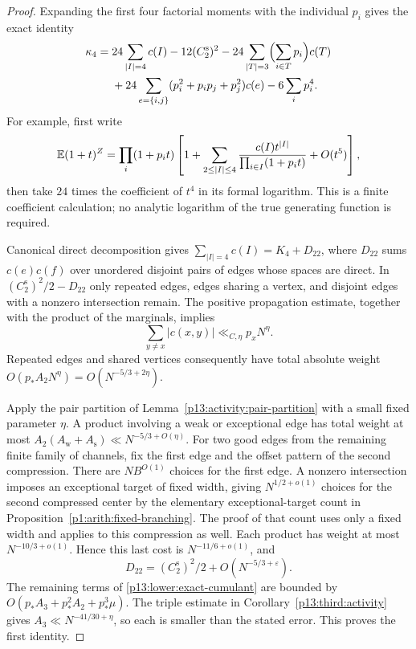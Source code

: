 \begin{proof}
Expanding the first four factorial moments with the individual $p_i$
gives the exact identity
\begin{align}
 \kappa_4={}&24\sum_{|I|=4}c(I)-12(C_2^{\mathrm s})^2
 -24\sum_{|T|=3}\Bigl(\sum_{i\in T}p_i\Bigr)c(T)\notag\\
 &+24\sum_{e=\{i,j\}}(p_i^2+p_ip_j+p_j^2)c(e)
 -6\sum_i p_i^4.
 \label{p13:lower:exact-cumulant}
\end{align}
For example, first write
\[
 \mathbb E(1+t)^Z=\prod_i(1+p_it)
 \left[1+\sum_{2\leq|I|\leq4}
       \frac{c(I)t^{|I|}}{\prod_{i\in I}(1+p_it)}+O(t^5)\right],
\]
then take $24$ times the coefficient of $t^4$ in its formal logarithm.
This is a finite coefficient calculation; no analytic logarithm of the
true generating function is required.

Canonical direct decomposition gives
$\sum_{|I|=4}c(I)=K_4+D_{22}$, where $D_{22}$ sums
$c(e)c(f)$ over unordered disjoint pairs of edges whose spaces are direct.
In $(C_2^{\mathrm s})^2/2-D_{22}$ only repeated edges, edges sharing a
vertex, and disjoint edges with a nonzero intersection remain.
The positive propagation estimate, together with the product of the
marginals, implies
\[
 \sum_{y\ne x}|c(x,y)|\ll_{C,\eta}p_xN^\eta.
\]
Repeated edges and shared vertices consequently have total absolute
weight $O(p_*A_2N^\eta)=O(N^{-5/3+2\eta})$.

Apply the pair partition of Lemma~\ref{p13:activity:pair-partition} with
a small fixed parameter $\eta$. A product involving a weak or exceptional
edge has total weight at most
$A_2(A_{\mathrm w}+A_{\mathrm s})
\ll N^{-5/3+O(\eta)}$.
For two good edges from the remaining finite family of channels, fix the
first edge and the offset pattern of the second compression. There are
$NB^{O(1)}$ choices for the first edge. A nonzero intersection imposes
an exceptional target of fixed width, giving $N^{1/2+o(1)}$ choices for
the second compressed center by the elementary exceptional-target count
in Proposition~\ref{p1:arith:fixed-branching}. The proof of that count
uses only a fixed width and applies to this compression as well.
Each product has weight at most $N^{-10/3+o(1)}$. Hence this last cost is
$N^{-11/6+o(1)}$, and
\[
 D_{22}=(C_2^{\mathrm s})^2/2+O(N^{-5/3+\varepsilon}).
\]
The remaining terms of \eqref{p13:lower:exact-cumulant} are bounded by
$O(p_*A_3+p_*^2A_2+p_*^3\mu)$.
The triple estimate in Corollary~\ref{p13:third:activity} gives
$A_3\ll N^{-41/30+\eta}$, so each is smaller than the stated error.
This proves the first identity.


\end{proof}
